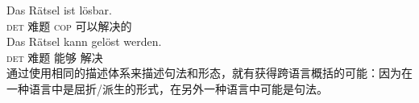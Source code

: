 \eal
\ex 
\gll Das Rätsel ist lösbar.\\
    \textsc{det} 难题 \textsc{cop} 可以解决的\\
\ex 
\gll Das Rätsel kann gelöst werden.\\
     \textsc{det} 难题 能够 解决 \passive\\
\zl
通过使用相同的描述体系来描述句法和形态，就有获得跨语言概括的可能：因为在一种语言中是屈折/派生的形式，在另外一种语言中可能是句法。

